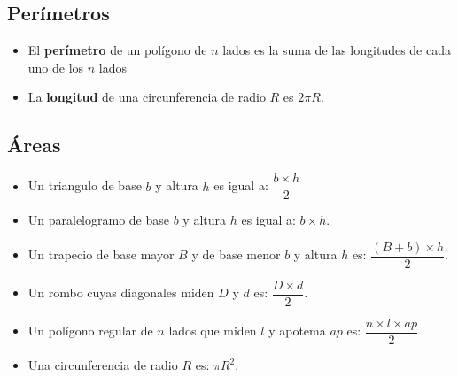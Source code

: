 \documentclass[10pt]{article}
\begin{document}
\subsection{Perímetros}
\begin{itemize}
\item El \textbf{perímetro} de un polígono de $n$ lados es la suma de las longitudes de cada uno de los $n$ lados
\item La \textbf{longitud} de una circunferencia de radio $R$ es $2 \pi R$.
\end{itemize}
\subsection{Áreas}
\begin{itemize}
\item Un triangulo de base $b$ y altura $h$ es igual a: $\dfrac{b \times h}{2}$
\item Un paralelogramo de base $b$ y altura $h$ es igual a: $b \times h$.
\item Un trapecio de base mayor $B$ y de base menor $b$ y altura $h$ es: $\dfrac{(B + b) \times h} {2}$.
\item Un rombo cuyas diagonales miden $D$ y $d$ es: $\dfrac{D \times d}{2}$.
\item Un polígono regular de $n$ lados que miden $l$ y apotema $ap$ es: $\dfrac{n \times l \times ap}{2}$
\item Una circunferencia de radio $R$ es: $\pi R^2$.
\end{itemize}
\end{document}

